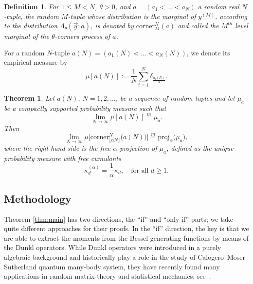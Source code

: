 \documentclass[11pt]{article}
\theoremstyle{plain}
\newtheorem{theorem}[lemma]{Theorem}
\newtheorem{definition}[lemma]{Definition}
\newcommand{\proj}{\text{proj}}
\newcommand{\corner}{\text{corner}}
\begin{document}
\begin{definition}
    For $1\le M< N$, $\theta>0$, and $a=(a_1<\dots<a_N)$ a random real $N$-tuple, the random $M$-tuple whose distribution is the marginal of $y^{(M)}$, according to the distribution $\Lambda_{\theta}(\vec{y};a)$, is denoted by $\text{corner}^{N}_{M}(a)$ and called the $M^{th}$ level marginal of the $\theta$-corners process of $a$.
\end{definition}


For a random $N$-tuple $a(N)=(a_1(N)<\dots<a_N(N))$, we denote its empirical measure by
\begin{equation}\label{eq:empirical_measure}
\mu[a(N)] := \frac{1}{N}\sum_{i=1}^{N}\delta_{\frac{a_{i}(N)}{N}}.
\end{equation}

\begin{theorem}\label{thm:beta_projection}
    Let $a(N)$, $N=1,2,\dots$, be a sequence of random tuples and let $\mu_a$ be a compactly supported probability measure such that
    \begin{equation}\label{assumption_corners}
    \lim_{N\rightarrow\infty}\mu[a(N)]\stackrel{m}{=}\mu_a.
    \end{equation}
    Then
    \[
    \lim_{N\to\infty}{\mu\big[\corner^N_{\lfloor\alpha N\rfloor}\big({a(N)}\big)\big]} \stackrel{m}{=} \proj_\alpha\big(\mu_a\big),
    \]
    where the right hand side is the free $\alpha$-projection of $\mu_a$, defined as the unique probability measure with free cumulants 
    $$\kappa_{d}^{(\alpha)} = \frac{1}{\alpha}\kappa_{d}, \quad\text{for all }d\ge 1.$$
\end{theorem}



\subsection{Methodology}


Theorem \ref{thm:main} has two directions, the ``if'' and ``only if'' parts; we take quite different approaches for their proofs.
In the ``if'' direction, the key is that we are able to extract the moments from the Bessel generating functions by means of the Dunkl operators.
While Dunkl operators were introduced in a purely algebraic background and historically play a role in the study of Calogero--Moser--Sutherland quantum many-body system, they have recently found many applications in random matrix theory and statistical mechanics; see~\cite{BCG,X,KX,GXZ,Y}.
\end{document}
